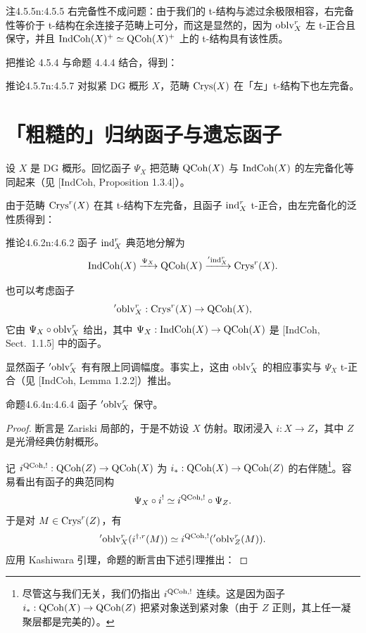 \begin{othm}{注}{4.5.5}{n:4.5.5}
右完备性不成问题：由于我们的 t-结构与滤过余极限相容，右完备性等价于 t-结构在余连接子范畴上可分，而这是显然的，因为 $\mathrm{oblv}^r_X$ 左 t-正合且保守，并且 $\mathrm{IndCoh}(X)^+\simeq\mathrm{QCoh}(X)^+$ 上的 t-结构具有该性质。
\end{othm}

把推论 4.5.4 与命题 4.4.4 结合，得到：

\begin{othm}{推论}{4.5.7}{n:4.5.7}
对拟紧 DG 概形 $X$，范畴 $\mathrm{Crys}(X)$ 在「左」t-结构下也左完备。
\end{othm}

\section{「粗糙的」归纳函子与遗忘函子}

设 $X$ 是 DG 概形。回忆函子 $\Psi_X$ 把范畴 $\mathrm{QCoh}(X)$ 与 $\mathrm{IndCoh}(X)$ 的左完备化等同起来（见 [IndCoh, Proposition 1.3.4]）。

由于范畴 $\mathrm{Crys}^r(X)$ 在其 t-结构下左完备，且函子 $\mathrm{ind}^r_X$ t-正合，由左完备化的泛性质得到：

\begin{othm}{推论}{4.6.2}{n:4.6.2}
函子 $\mathrm{ind}^r_X$ 典范地分解为
\[
\mathrm{IndCoh}(X)\xrightarrow{\Psi_X}\mathrm{QCoh}(X)\xrightarrow{{}'\mathrm{ind}^r_X}\mathrm{Crys}^r(X).
\]
\end{othm}

也可以考虑函子
\[
{}'\mathrm{oblv}^r_X:\mathrm{Crys}^r(X)\to\mathrm{QCoh}(X),
\]
它由 $\Psi_X\circ\mathrm{oblv}^r_X$ 给出，其中 $\Psi_X:\mathrm{IndCoh}(X)\to\mathrm{QCoh}(X)$ 是 [IndCoh, Sect.~1.1.5] 中的函子。

显然函子 ${}'\mathrm{oblv}^r_X$ 有有限上同调幅度。事实上，这由 $\mathrm{oblv}^r_X$ 的相应事实与 $\Psi_X$ t-正合（见 [IndCoh, Lemma 1.2.2]）推出。

\begin{othm}{命题}{4.6.4}{n:4.6.4}
函子 ${}'\mathrm{oblv}^r_X$ 保守。
\end{othm}

\begin{proof}
断言是 Zariski 局部的，于是不妨设 $X$ 仿射。取闭浸入 $i:X\to Z$，其中 $Z$ 是光滑经典仿射概形。

记 $i^{\mathrm{QCoh},!}:\mathrm{QCoh}(Z)\to\mathrm{QCoh}(X)$ 为 $i_*:\mathrm{QCoh}(X)\to\mathrm{QCoh}(Z)$ 的右伴随\footnote{尽管这与我们无关，我们仍指出 $i^{\mathrm{QCoh},!}$ 连续。这是因为函子 $i_*:\mathrm{QCoh}(X)\to\mathrm{QCoh}(Z)$ 把紧对象送到紧对象（由于 $Z$ 正则，其上任一凝聚层都是完美的）。}。容易看出有函子的典范同构
\[
\Psi_X\circ i^!\simeq i^{\mathrm{QCoh},!}\circ\Psi_Z.
\]
于是对 $M\in\mathrm{Crys}^r(Z)$，有
\[
{}'\mathrm{oblv}^r_X(i^{\dagger,r}(M))\simeq i^{\mathrm{QCoh},!}({}'\mathrm{oblv}^r_Z(M)).
\]
应用 Kashiwara 引理，命题的断言由下述引理推出：
\end{proof}

